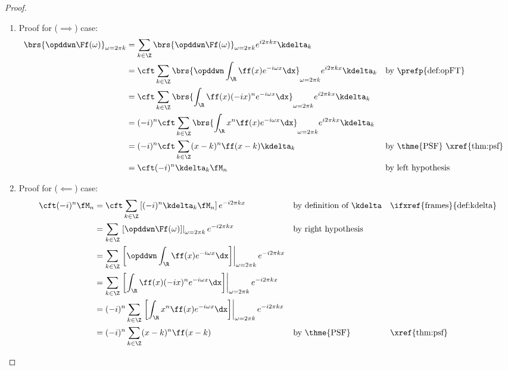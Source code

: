 \begin{proof}
\begin{enumerate}
  \item Proof for ($\implies$) case:
    \begin{align*}
      \brs{\opddwn  \Ff(\omega)}_{\omega=2\pi k}
        &= \sum_{k\in\Z} \brs{\opddwn  \Ff(\omega)}_{\omega=2\pi k}  e^{i2\pi kx} \kdelta_k
      \\&= \cft \sum_{k\in\Z} \brs{\opddwn \int_\R  \ff(x) e^{-i\omega x} \dx}_{\omega=2\pi k} e^{i2\pi kx}  \kdelta_k
        && \text{by \prefp{def:opFT}}
      \\&= \cft \sum_{k\in\Z} \brs{\int_\R  \ff(x)(-ix)^n e^{-i\omega x} \dx}_{\omega=2\pi k} e^{i2\pi kx}  \kdelta_k
      \\&= (-i)^n \cft \sum_{k\in\Z} \brs{\int_\R  x^n \ff(x)  e^{-i\omega x} \dx}_{\omega=2\pi k} e^{i2\pi kx}  \kdelta_k
      \\&= (-i)^n \cft \sum_{k\in\Z} (x-k)^n \ff(x-k)  \kdelta_k
        && \text{by \thme{PSF} \xref{thm:psf}}
      \\&= \cft (-i)^n \kdelta_k \fM_n
        && \text{by left hypothesis}
    \end{align*}

 
  \item Proof for ($\impliedby$) case:
    \begin{align*}
      \cft (-i)^n \fM_n
        &= \cft \sum_{k\in\Z} \left[(-i)^n \kdelta_k \fM_n \right] e^{-i2\pi kx}
        && \text{by definition of $\kdelta$}
        && \text{\ifxref{frames}{def:kdelta}}
      \\&= \sum_{k\in\Z} \left. 
           \left[\opddwn  \Ff(\omega)\right]\right|_{\omega=2\pi k} 
           e^{-i2\pi kx}
        && \text{by right hypothesis}
      \\&= \sum_{k\in\Z} \left. 
           \left[
           \opddwn 
           \int_\R  \ff(x) e^{-i\omega x} \dx
           \right]
           \right|_{\omega=2\pi k} e^{-i2\pi kx}
      \\&= \sum_{k\in\Z} \left. 
           \left[
           \int_\R  \ff(x)(-ix)^n e^{-i\omega x} \dx
           \right]
           \right|_{\omega=2\pi k} e^{-i2\pi kx}
      \\&= (-i)^n \sum_{k\in\Z} \left.
           \left[
           \int_\R  x^n \ff(x)  e^{-i\omega x} \dx
           \right]
           \right|_{\omega=2\pi k} e^{-i2\pi kx}
      \\&= (-i)^n \sum_{k\in\Z} (x-k)^n \ff(x-k) 
        && \text{by \thme{PSF}}
        && \text{\xref{thm:psf}}
    \end{align*}

\end{enumerate}
\end{proof}

